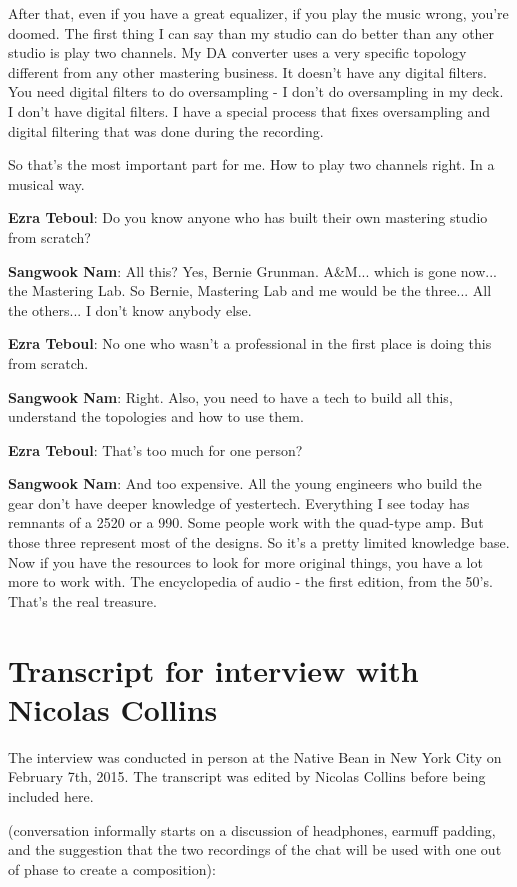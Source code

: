 After that, even if you have a great equalizer, if you play the music wrong, you're doomed. The first thing I can say than my studio can do better than any other studio is play two channels. My DA converter uses a very specific topology different from any other mastering business. It doesn't have any digital filters. You need digital filters to do oversampling - I don't do oversampling in my deck. I don't have digital filters. I have a special process that fixes oversampling and digital filtering that was done during the recording.

So that's the most important part for me. How to play two channels right. In a musical way.

\textbf{Ezra Teboul}: Do you know anyone who has built their own mastering studio from scratch?

\textbf{Sangwook Nam}: All this? Yes, Bernie Grunman. A\&M... which is gone now... the Mastering Lab. So Bernie, Mastering Lab and me would be the three... All the others... I don't know anybody else.

\textbf{Ezra Teboul}: No one who wasn't a professional in the first place is doing this from scratch.

\textbf{Sangwook Nam}: Right. Also, you need to have a tech to build all this, understand the topologies and how to use them.

\textbf{Ezra Teboul}: That's too much for one person?

\textbf{Sangwook Nam}: And too expensive. All the young engineers who build the gear don't have deeper knowledge of yestertech. Everything I see today has remnants of a 2520 or a 990. Some people work with the quad-type amp. But those three represent most of the designs. So it's a pretty limited knowledge base. Now if you have the resources to look for more original things, you have a lot more to work with. The encyclopedia of audio - the first edition, from the 50's. That's the real treasure.

\newpage

\clearpage 
\section{Transcript for interview with Nicolas Collins}

The interview was conducted in person at the Native Bean in New York City on February 7th, 2015. The transcript was edited by Nicolas Collins before being included here.  
					
(conversation informally starts on a discussion of headphones, earmuff padding, and the suggestion that the two recordings of the chat will be used with one out of phase to create a composition):
					
